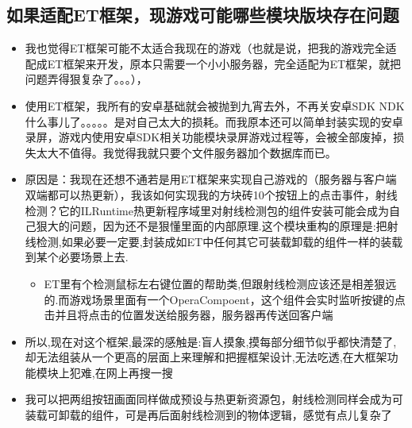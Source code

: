 \documentclass[9pt, b5paper]{article}
\begin{document}
\subsection{如果适配ET框架，现游戏可能哪些模块版块存在问题}
\label{sec-2-1}
\begin{itemize}
\item 我也觉得ET框架可能不太适合我现在的游戏（也就是说，把我的游戏完全适配成ET框架来开发，原本只需要一个小小服务器，完全适配为ET框架，就把问题弄得狠复杂了。。。），
\item 使用ET框架，我所有的安卓基础就会被抛到九宵去外，不再关安卓SDK  NDK什么事儿了。。。。。是对自己太大的损耗。而我原本还可以简单封装实现的安卓录屏，游戏内使用安卓SDK相关功能模块录屏游戏过程等，会被全部废掉，损失太大不值得。我觉得我就只要个文件服务器加个数据库而已。
\item 原因是：我现在还想不通若是用ET框架来实现自己游戏的（服务器与客户端双端都可以热更新），我该如何实现我的方块砖10个按钮上的点击事件，射线检测？它的ILRuntime热更新程序域里对射线检测包的组件安装可能会成为自己狠大的问题，因为还不是狠懂里面的内部原理.这个模块重构的原理是:把射线检测,如果必要一定要,封装成如ET中任何其它可装载卸载的组件一样的装载到某个必要场景上去.
\begin{itemize}
\item ET里有个检测鼠标左右键位置的帮助类,但跟射线检测应该还是相差狠远的.而游戏场景里面有一个OperaCompoent，这个组件会实时监听按键的点击并且将点击的位置发送给服务器，服务器再传送回客户端
\end{itemize}
\item 所以,现在对这个框架,最深的感触是:盲人摸象,摸每部分细节似乎都快清楚了,却无法组装从一个更高的层面上来理解和把握框架设计,无法吃透,在大框架功能模块上犯难,在网上再搜一搜
\item 我可以把两组按钮画面同样做成预设与热更新资源包，射线检测同样会成为可装载可卸载的组件，可是再后面射线检测到的物体逻辑，感觉有点儿复杂了
\end{itemize}
\end{document}
